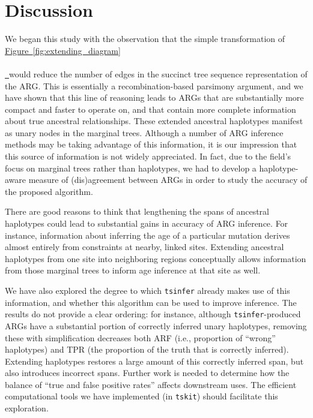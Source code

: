 \documentclass[10pt,twoside,lineno]{gsajnl}
\newcommand{\tskit}{\texttt{tskit}}
\newcommand{\tsinfer}{\texttt{tsinfer}}
\newcommand*{\figref}[2][]{%
	\hyperref[{#2}]{%
		Figure~\ref*{#2}%
		\ifx\\#1\\%
		\else
		\,#1%
		\fi
	}%
}
\begin{document}
\section{Discussion}

We began this study with the observation that the simple transformation
of \figref{fig:extending_diagram} would reduce the number of edges
in the succinct tree sequence representation of the ARG.
This is essentially a recombination-based parsimony argument,
and we have shown that this line of reasoning
leads to ARGs that are substantially more compact and faster to operate on,
and that contain more complete information about true ancestral relationships. %
These extended ancestral haplotypes manifest as unary nodes in the marginal trees.
Although a number of ARG inference methods may be taking advantage of this information,
it is our impression that this source of information is not widely appreciated.
In fact, due to the field's focus on marginal trees rather than haplotypes,
we had to develop a haplotype-aware measure of (dis)agreement between ARGs in order to study the accuracy of the proposed algorithm.

There are good reasons to think that lengthening the spans of ancestral haplotypes
could lead to substantial gains in accuracy of ARG inference.
For instance, information about inferring the age of a particular mutation
derives almost entirely from constraints at nearby, linked sites.
Extending ancestral haplotypes from one site into neighboring regions
conceptually allows information from those marginal trees
to inform age inference at that site as well.

We have also explored the degree to which \tsinfer{} already makes use of this information,
and whether this algorithm can be used to improve inference.
The results do not provide a clear ordering:
for instance, although \tsinfer-produced ARGs
have a substantial portion of correctly inferred unary haplotypes,
removing these with simplification decreases both ARF
(i.e., proportion of ``wrong'' haplotypes)
and TPR (the proportion of the truth that is correctly inferred).
Extending haplotypes restores a large amount of this correctly inferred span,
but also introduces incorrect spans.
Further work is needed to determine how the balance of ``true and false positive rates''
affects downstream uses.
The efficient computational tools we have implemented (in \tskit{})
should facilitate this exploration.
\end{document}
